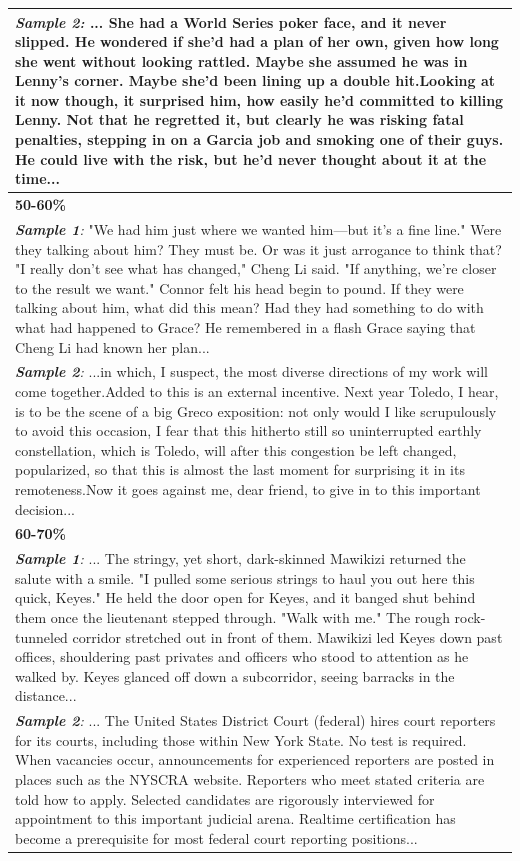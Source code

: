 \documentclass[11pt]{article}
\begin{document}
\begin{longtable}{p{15cm}}
\small \textit{\textbf{Sample 2}:}  ... She had a World Series poker face, and it never slipped. He wondered if she'd had a plan of her own, given how long she went without looking rattled. Maybe she assumed he was in Lenny's corner. Maybe she'd been lining up a double hit.Looking at it now though, it surprised him, how easily he'd committed to killing Lenny. Not that he regretted it, but clearly he was risking fatal penalties, stepping in on a Garcia job and smoking one of their guys. He could live with the risk, but he'd never thought about it at the time...\\
\midrule
\small \textbf{50-60\%} \\
\midrule
\small \textit{\textbf{Sample 1}:}   "We had him just where we wanted him—but it's a fine line." Were they talking about him? They must be. Or was it just arrogance to think that? "I really don't see what has changed," Cheng Li said. "If anything, we're closer to the result we want." Connor felt his head begin to pound. If they were talking about him, what did this mean? Had they had something to do with what had happened to Grace? He remembered in a flash Grace saying that Cheng Li had known her plan...  \\
\small \textit{\textbf{Sample 2}:}  ...in which, I suspect, the most diverse directions of my work will come together.Added to this is an external incentive. Next year Toledo, I hear, is to be the scene of a big Greco exposition: not only would I like scrupulously to avoid this occasion, I fear that this hitherto still so uninterrupted earthly constellation, which is Toledo, will after this congestion be left changed, popularized, so that this is almost the last moment for surprising it in its remoteness.Now it goes against me, dear friend, to give in to this important decision...\\
\midrule
\small \textbf{60-70\%} \\
\midrule
\small \textit{\textbf{Sample 1}:} ... The stringy, yet short, dark-skinned Mawikizi returned the salute with a smile. "I pulled some serious strings to haul you out here this quick, Keyes." He held the door open for Keyes, and it banged shut behind them once the lieutenant stepped through. "Walk with me." The rough rock-tunneled corridor stretched out in front of them. Mawikizi led Keyes down past offices, shouldering past privates and officers who stood to attention as he walked by. Keyes glanced off down a subcorridor, seeing barracks in the distance...  \\
\small \textit{\textbf{Sample 2}:}  ... The United States District Court (federal) hires court reporters for its courts, including those within New York State. No test is required. When vacancies occur, announcements for experienced reporters are posted in places such as the NYSCRA website. Reporters who meet stated criteria are told how to apply. Selected candidates are rigorously interviewed for appointment to this important judicial arena. Realtime certification has become a prerequisite for most federal court reporting positions...\\

\end{longtable}
\end{document}
